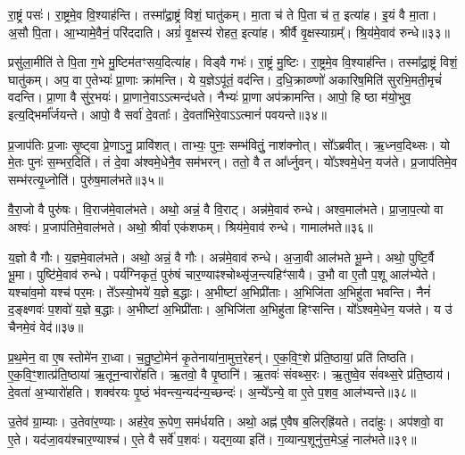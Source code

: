 रा॒ष्ट्रं पसः॑।
रा॒ष्ट्रमे॒व वि॒श्याह॑न्ति।
तस्मा᳚द्रा॒ष्ट्रं विशं॒ घातु॑कम्।
मा॒ता च॑ ते पि॒ता च॑ त॒ इत्या॑ह।
इ॒यं वै मा॒ता।
अ॒सौ पि॒ता।
आ॒भ्यामे॒वैनं॒ परि॑ददाति।
अग्रं॑ वृ॒क्षस्य॑ रोहत॒ इत्या॑ह।
श्रीर्वै वृ॒क्षस्याग्रम्᳚।
श्रि॒य॑मे॒वाव॑ रुन्धे॥३३॥\ip

प्रसु॑ला॒मीति॑ ते पि॒ता ग॒भे मु॒ष्टिम॑तꣳसय॒दित्या॑ह।
विड्वै गभः॑।
रा॒ष्ट्रं मु॒ष्टिः।
रा॒ष्ट्रमे॒व वि॒श्याह॑न्ति।
तस्मा᳚द्रा॒ष्ट्रं विशं॒ घातु॑कम्।
अप॒ वा ए॒तेभ्यः॑ प्रा॒णाः क्रा॑मन्ति।
ये य॒ज्ञे\-ऽपू॑तं॒ वद॑न्ति।
द॒धि॒क्राव्ण्णो॑ अकारिष॒मिति॑ सुरभि॒मती॒मृचं॑ वदन्ति।
प्रा॒णा वै सु॑र॒भयः॑।
प्रा॒णाने॒वाऽऽत्मन्द॑धते।
नैभ्यः॑ प्रा॒णा अप॑क्रामन्ति।
आपो॒ हि ष्ठा म॑यो॒भुव॒ इत्य॒द्भिर्मा᳚र्जयन्ते।
आपो॒ वै सर्वा॑ दे॒वताः᳚।
दे॒वता॑भिरे॒वाऽऽत्मानं॑ पवयन्ते॥३४॥\ip\anuvakamend[रा॒ष्ट्रस्य॒ मध्यं॒ पुष्य॑ति॒ गभो॑ रुन्धे दधते च॒त्वारि॑ च]

प्र॒जा\-प॑तिः प्र॒जाः सृ॒ष्ट्वा प्रे॒णाऽनु॒ प्रावि॑शत्।
ताभ्यः॒ पुनः॒ सम्भ॑वितुं॒ नाश॑क्नोत्।
सो᳚ऽब्रवीत्।
ऋ॒ध्नव॒दिथ्सः।
यो मे॒तः पुनः॑ स॒म्भर॒दिति॑।
तं दे॒वा अ॑श्वमे॒धेनै॒व सम॑भरन्।
ततो॒ वै त आ᳚र्ध्नुवन्।
यो᳚ऽश्वमे॒धेन॒ यज॑ते।
प्र॒जा\-प॑तिमे॒व सम्भ॑रत्यृ॒ध्नोति॑।
पुरु॑ष॒माल॑भते॥३५॥\ip

वै॒रा॒जो वै पुरु॑षः।
वि॒राज॑मे॒वाल॑भते।
अथो॒ अन्नं॒ वै वि॒राट्।
अन्न॑मे॒वाव॑ रुन्धे।
अश्व॒माल॑भते।
प्रा॒जा॒प॒त्यो वा अश्वः॑।
प्र॒जा\-प॑तिमे॒वाल॑भते।
अथो॒ श्रीर्वा एक॑शफम्।
श्रिय॑मे॒वाव॑ रुन्धे।
गामाल॑भते॥३६॥\ip

य॒ज्ञो वै गौः।
य॒ज्ञमे॒वाल॑भते।
अथो॒ अन्नं॒ वै गौः।
अन्न॑मे॒वाव॑ रुन्धे।
अ॒जा॒वी आल॑भते भू॒म्ने।
अथो॒ पुष्टि॒र्वै भू॒मा।
पुष्टि॑मे॒वाव॑ रुन्धे।
पर्य॑ग्निकृतं॒ पुरु॑षं चार॒ण्याꣴश्चोथ्सृ॑ज॒न्त्यहिꣳ॑सायै।
उ॒भौ वा ए॒तौ प॒शू आल॑भ्येते।
यश्चा॑व॒मो यश्च॑ पर॒मः।
ते᳚ऽस्यो॒भये॑ य॒ज्ञे ब॒द्धाः।
अ॒भीष्टा॑ अ॒भिप्री॑ताः।
अ॒भिजि॑ता अ॒भिहु॑ता भवन्ति।
नैनं॑ द॒ङ्क्ष्णवः॑ प॒शवो॑ य॒ज्ञे ब॒द्धाः।
अ॒भीष्टा॑ अ॒भिप्री॑ताः।
अ॒भिजि॑ता अ॒भिहु॑ता हिꣳसन्ति।
यो᳚ऽश्वमे॒धेन॒ यज॑ते।
य उ॑ चैनमे॒वं वेद॑॥३७॥\ip\anuvakamend[ल॒भ॒ते॒ गामाल॑भते पर॒मो᳚\-ऽष्टौ च॑]

प्र॒थ॒मेन॒ वा ए॒ष स्तोमे॑न रा॒ध्वा।
च॒तु॒ष्टो॒मेन॑ कृ॒तेनाया॑ना॒मुत्त॒रे\-हन्॑।
ए॒क॒वि॒ꣳ॒शे प्र॑ति॒ष्ठायां॒ प्रति॑ तिष्ठति।
ए॒क॒वि॒ꣳ॒शात्प्र॑ति॒ष्ठाया॑ ऋ॒तून॒न्वारो॑हति।
ऋ॒तवो॒ वै पृ॒ष्ठानि॑।
ऋ॒तवः॑ संवथ्स॒रः।
ऋ॒तुष्वे॒व सं॑वथ्स॒रे प्र॑ति॒ष्ठाय॑।
दे॒वता॑ अ॒भ्यारो॑हति।
शक्व॑रयः पृ॒ष्ठं भ॑वन्त्य॒न्यद॑न्य॒च्छन्दः॑।
अ॒न्ये᳚\-ऽन्ये॒ वा ए॒ते प॒शव॒ आल॑भ्यन्ते॥३८॥\ip

उ॒तेव॑ ग्रा॒म्याः।
उ॒तेवा॑र॒ण्याः।
अह॑रे॒व रू॒पेण॒ सम॑र्धयति।
अथो॒ अह्न॑ ए॒वैष ब॒लिर्‌\mbox{}ह्रि॑यते।
तदा॑हुः।
अप॑शवो॒ वा ए॒ते।
यद॑जा॒वय॑श्चार॒ण्याश्च॑।
ए॒ते वै सर्वे॑ प॒शवः॑।
यद्ग॒व्या इति॑।
ग॒व्यान्प॒शूनु॑त्त॒मेऽहं॒ नाल॑भते॥३९॥\ip

